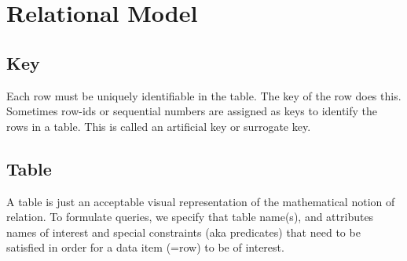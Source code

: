 \documentclass[a4paper]{article}
\theoremstyle{plain}
\theoremstyle{definition}
\theoremstyle{remark}
\begin{document}
	\section{Relational Model}
	\subsection{Key}
	Each row must be uniquely identifiable in the table. The key of the row does this. Sometimes row-ids or sequential numbers are assigned as keys to identify the rows in a table. This is called an artificial key or surrogate key. 
	\subsection{Table}
	A table is just an acceptable visual representation of the mathematical notion of relation. To formulate queries, we specify that table name(s), and attributes names of interest and special constraints (aka predicates) that need to be satisfied in order for a data item (=row) to be of interest. 
\end{document}
